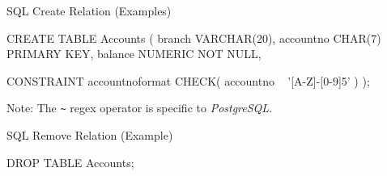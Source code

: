 \begin{multicols}{2}
\begin{CheatsheetEntryFrame}



        \SubsectionFrameAddSeparation
        \begin{SqlSubsection}{SQL Create Relation (Examples)}
            \begin{CheatsheetSubsectionLst}
                CREATE TABLE Accounts (
                    branch      VARCHAR(20),
                    accountno   CHAR(7)       PRIMARY KEY,
                    balance     NUMERIC       NOT NULL,

                    CONSTRAINT accountnoformat CHECK(
                        accountno ~ '[A-Z]-[0-9]{5}'
                    )
                );
            \end{CheatsheetSubsectionLst}

            \medskip
            {\footnotesize Note: The \texttt{\textasciitilde} regex operator is specific to \textit{PostgreSQL}.}
        \end{SqlSubsection}
        \SubsectionFrameReduceSkip
        \begin{SqlSubsection}{SQL Remove Relation (Example)}%
            \begin{CheatsheetSubsectionLst}
                DROP TABLE Accounts;
            \end{CheatsheetSubsectionLst}
        \end{SqlSubsection}


\end{CheatsheetEntryFrame}
\end{multicols}
